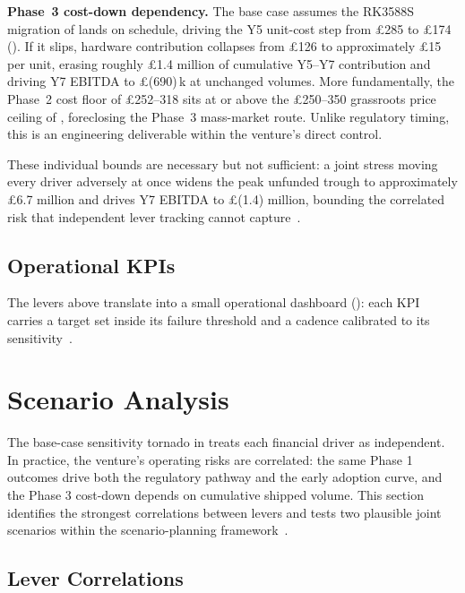 \textbf{Phase~3 cost-down dependency.} The base case assumes the RK3588S migration of  lands on schedule, driving the Y5 unit-cost step from \pounds285 to \pounds174 (). If it slips, hardware contribution collapses from \pounds126 to approximately \pounds15 per unit, erasing roughly \pounds1.4 million of cumulative Y5--Y7 contribution and driving Y7 EBITDA to \pounds(690)\,k at unchanged volumes. More fundamentally, the Phase~2 cost floor of \pounds252--318 sits at or above the \pounds250--350 grassroots price ceiling of , foreclosing the Phase~3 mass-market route. Unlike regulatory timing, this is an engineering deliverable within the venture's direct control.

These individual bounds are necessary but not sufficient: a joint stress moving every driver adversely at once widens the peak unfunded trough to approximately \pounds6.7 million and drives Y7 EBITDA to \pounds(1.4) million, bounding the correlated risk that independent lever tracking cannot capture~\citep{saltelli2004sensitivity}.

\subsection{Operational KPIs}
\label{sec:ent-kpis}

The levers above translate into a small operational dashboard (): each KPI carries a target set inside its failure threshold and a cadence calibrated to its sensitivity~\citep{kaplan1996balanced}.




\section{Scenario Analysis}
\label{sec:ent-scenarios}

The base-case sensitivity tornado in  treats each financial driver as independent. In practice, the venture's operating risks are correlated: the same Phase 1 outcomes drive both the regulatory pathway and the early adoption curve, and the Phase 3 cost-down depends on cumulative shipped volume. This section identifies the strongest correlations between levers and tests two plausible joint scenarios within the scenario-planning framework~\cite{schoemaker1995scenario}.

\subsection{Lever Correlations}

